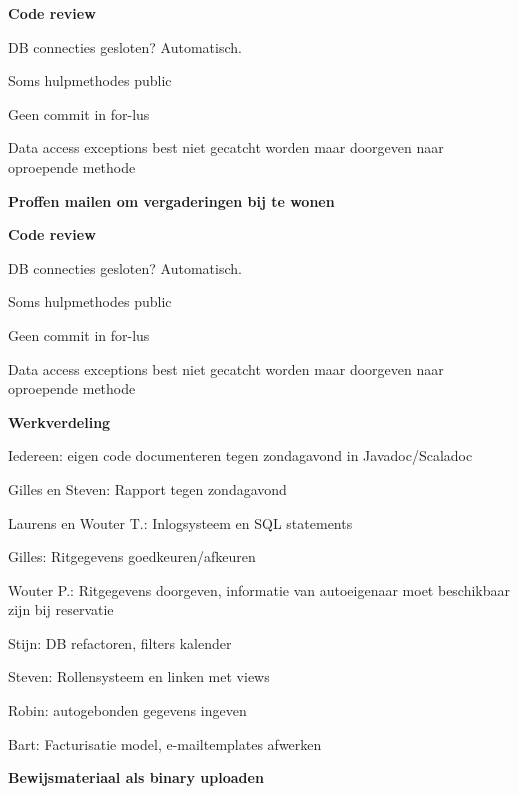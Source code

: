 \documentclass[11pt,a4paper,oneside]{article}
\renewenvironment{itemize}[1]{\begin{compactitem}#1}{\end{compactitem}}
\begin{document}
\begin{itemize}
\item \textbf{Code review}
		\begin{itemize}
           \item DB connecties gesloten? Automatisch.
		\item Soms hulpmethodes public
		\item Geen commit in for-lus
		\item Data access exceptions best niet gecatcht worden maar doorgeven naar oproepende methode
        \end{itemize}

\item \textbf{Proffen mailen om vergaderingen bij te wonen}
	
	\item \textbf{Code review}
		\begin{itemize}
           \item DB connecties gesloten? Automatisch.
		\item Soms hulpmethodes public
		\item Geen commit in for-lus
		\item Data access exceptions best niet gecatcht worden maar doorgeven naar oproepende methode
        \end{itemize}
	
	\item \textbf{Werkverdeling}
		\begin{itemize}
           \item Iedereen: eigen code documenteren tegen zondagavond in Javadoc/Scaladoc
	\item Gilles en Steven: Rapport tegen zondagavond
	\item Laurens en Wouter T.: Inlogsysteem en SQL statements
	\item Gilles: Ritgegevens goedkeuren/afkeuren
	\item Wouter P.: Ritgegevens doorgeven, informatie van autoeigenaar moet beschikbaar zijn bij reservatie
	\item Stijn: DB refactoren, filters kalender
	\item Steven: Rollensysteem en linken met views
	\item Robin: autogebonden gegevens ingeven
	\item Bart: Facturisatie model, e-mailtemplates afwerken
        \end{itemize}
		
	\item \textbf{Bewijsmateriaal als binary uploaden}	
	



	

	
        



\end{itemize}
\end{document}
